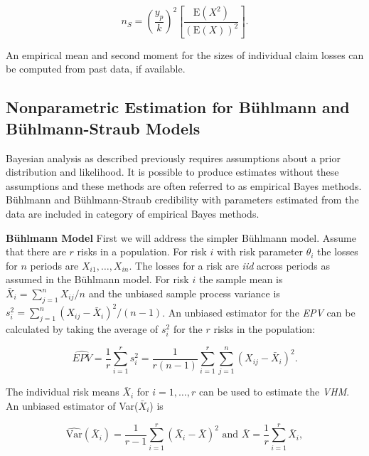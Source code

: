 \documentclass[]{book}
\theoremstyle{definition}
\theoremstyle{definition}
\theoremstyle{definition}
\theoremstyle{remark}
\begin{document}
\begin{equation*}
n_S=\left(\frac{y_p}{k}\right)^2\left[\frac{\mathrm{E}(X^2)}{(\mathrm{E}(X))^2}\right].
\end{equation*}

An empirical mean and second moment for the sizes of individual claim
losses can be computed from past data, if available.

\subsection{Nonparametric Estimation for Bühlmann and Bühlmann-Straub
Models}\label{nonparametric-estimation-for-buhlmann-and-buhlmann-straub-models}

Bayesian analysis as described previously requires assumptions about a
prior distribution and likelihood. It is possible to produce estimates
without these assumptions and these methods are often referred to as
empirical Bayes methods. Bühlmann and Bühlmann-Straub credibility with
parameters estimated from the data are included in category of empirical
Bayes methods.

\textbf{Bühlmann Model} First we will address the simpler Bühlmann
model. Assume that there are \(r\) risks in a population. For risk \(i\)
with risk parameter \(\theta_i\) the losses for \(n\) periods are
\(X_{i1},\ldots, X_{in}\). The losses for a risk are \emph{iid} across
periods as assumed in the Bühlmann model. For risk \(i\) the sample mean
is \(\bar{X}_i=\sum_{j=1}^{n}X_{ij}/n\) and the unbiased sample process
variance is \(s_i^2=\sum_{j=1}^{n}(X_{ij}-\bar{X}_i)^2/(n-1)\). An
unbiased estimator for the \emph{EPV} can be calculated by taking the
average of \(s_i^2\) for the \(r\) risks in the population:

\begin{equation}  
\widehat{EPV}=\frac{1}{r}\sum_{i=1}^{r} s_i^2 = \frac{1}{r(n-1)} \sum_{i=1}^{r} \sum_{j=1}^{n}(X_{ij}-\bar{X}_i)^2 .
\label{eq:EPV-estimate}
\end{equation}

The individual risk means \(\bar{X}_i\) for \(i=1,\ldots, r\) can be
used to estimate the \emph{VHM}. An unbiased estimator of
Var(\(\bar{X}_i\)) is

\begin{equation*} 
\widehat{\mathrm{Var}}(\bar{X}_i)=\frac{1}{r-1} \sum_{i=1}^{r}(\bar{X}_i-\bar{X})^2 \textrm{  and  }  \bar{X}=\frac{1}{r}\sum_{i=1}^{r} \bar{X}_i,
\end{equation*}
\end{document}
